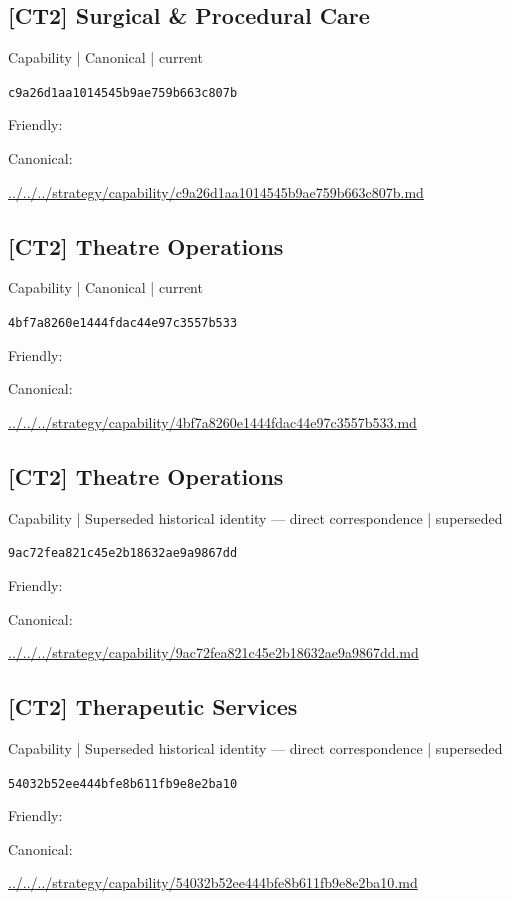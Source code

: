 \documentclass[10pt,a4paper]{article}
\begin{document}
\subsection*{[CT2] Surgical \& Procedural Care}
{\small Capability | Canonical | current}\par
\texttt{c9a26d1aa1014545b9ae759b663c807b}\par
Friendly: \par
Canonical: \par
{\footnotesize\url{../../../strategy/capability/c9a26d1aa1014545b9ae759b663c807b.md}}\par
\subsection*{[CT2] Theatre Operations}
{\small Capability | Canonical | current}\par
\texttt{4bf7a8260e1444fdac44e97c3557b533}\par
Friendly: \par
Canonical: \par
{\footnotesize\url{../../../strategy/capability/4bf7a8260e1444fdac44e97c3557b533.md}}\par
\subsection*{[CT2] Theatre Operations}
{\small Capability | Superseded historical identity — direct correspondence | superseded}\par
\texttt{9ac72fea821c45e2b18632ae9a9867dd}\par
Friendly: \par
Canonical: \par
{\footnotesize\url{../../../strategy/capability/9ac72fea821c45e2b18632ae9a9867dd.md}}\par
\subsection*{[CT2] Therapeutic Services}
{\small Capability | Superseded historical identity — direct correspondence | superseded}\par
\texttt{54032b52ee444bfe8b611fb9e8e2ba10}\par
Friendly: \par
Canonical: \par
{\footnotesize\url{../../../strategy/capability/54032b52ee444bfe8b611fb9e8e2ba10.md}}\par
\end{document}
